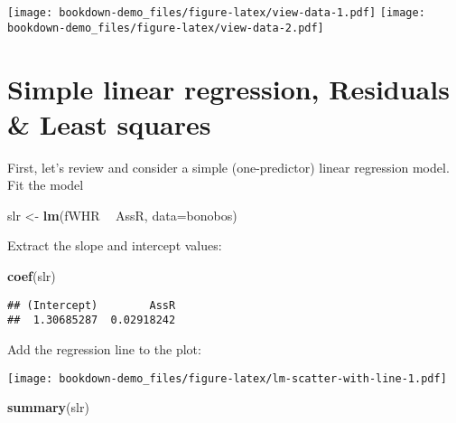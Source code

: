\documentclass[]{book}
\newenvironment{Shaded}{\begin{snugshade}}{\end{snugshade}}
\newcommand{\DataTypeTok}[1]{\textcolor[rgb]{0.13,0.29,0.53}{#1}}
\newcommand{\KeywordTok}[1]{\textcolor[rgb]{0.13,0.29,0.53}{\textbf{#1}}}
\newcommand{\NormalTok}[1]{#1}
\newcommand{\OperatorTok}[1]{\textcolor[rgb]{0.81,0.36,0.00}{\textbf{#1}}}
\newcommand{\StringTok}[1]{\textcolor[rgb]{0.31,0.60,0.02}{#1}}
\begin{document}
\texttt{[image: bookdown-demo\_files/figure-latex/view-data-1.pdf]} \texttt{[image: bookdown-demo\_files/figure-latex/view-data-2.pdf]}

\hypertarget{simple-linear-regression-residuals-least-squares}{%
\section{Simple linear regression, Residuals \& Least squares}\label{simple-linear-regression-residuals-least-squares}}

First, let's review and consider a simple (one-predictor) linear regression model. Fit the model

\begin{Shaded}
\begin{Highlighting}[]
\NormalTok{slr <-}\StringTok{ }\KeywordTok{lm}\NormalTok{(fWHR }\OperatorTok{~}\StringTok{ }\NormalTok{AssR, }\DataTypeTok{data=}\NormalTok{bonobos)}
\end{Highlighting}
\end{Shaded}

Extract the slope and intercept values:

\begin{Shaded}
\begin{Highlighting}[]
\KeywordTok{coef}\NormalTok{(slr)}
\end{Highlighting}
\end{Shaded}

\begin{verbatim}
## (Intercept)        AssR 
##  1.30685287  0.02918242
\end{verbatim}

Add the regression line to the plot:

\begin{Shaded}
\end{Shaded}

\texttt{[image: bookdown-demo\_files/figure-latex/lm-scatter-with-line-1.pdf]}

\begin{Shaded}
\begin{Highlighting}[]
\KeywordTok{summary}\NormalTok{(slr)}
\end{Highlighting}
\end{Shaded}
\end{document}
